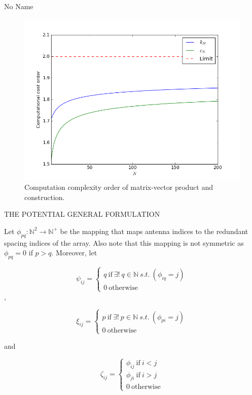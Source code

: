 \documentclass[a4paper,10pt]{article}
\begin{document}
\begin{section}{No Name}
\begin{figure}
  \includegraphics[width=\linewidth]{k_N.png}
  \caption{Computation complexity order of matrix-vector product and construction.}
\end{figure}

THE POTENTIAL GENERAL FORMULATION

Let $\phi_{pq}:\mathbb{N}^2\rightarrow\mathbb{N}^+$ be the mapping that maps antenna indices to the redundant spacing indices of the array. Also note that this mapping is not symmetric as 
$\phi_{pq} = 0$ if $p>q$. Moreover, let

\begin{equation}
\psi_{ij} = 
\begin{cases}
q~\textrm{if}~\exists! ~ q \in \mathbb{N} ~ s.t. ~(\phi_{iq} = j)\\
0~\textrm{otherwise}
\end{cases}
\end{equation},

\begin{equation}
\xi_{ij} = 
\begin{cases}
p~\textrm{if}~\exists! ~ p \in \mathbb{N} ~ s.t. ~(\phi_{pi} = j)\\
0~\textrm{otherwise}
\end{cases}
\end{equation}

and

\begin{equation}
\zeta_{ij} = 
\begin{cases}
\phi_{ij}~\textrm{if}~i<j\\
\phi_{ji}~\textrm{if}~i>j\\
0~\textrm{otherwise}
\end{cases}
\end{equation}


\end{section}
\end{document}

